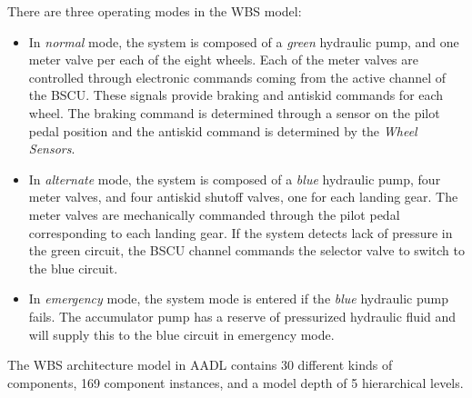 There are three operating modes in the WBS model:

\begin{itemize}
	\renewcommand{\labelitemi}{\textbullet}
	\item In \textit{normal} mode, the system is composed of a \textit{green} hydraulic pump, and one meter valve per each of the eight wheels. Each of the meter valves are controlled through electronic commands coming from the active channel of the BSCU. These signals provide braking and antiskid commands for each wheel. The braking command is determined through a sensor on the pilot pedal position and the antiskid command is determined by the \textit{Wheel Sensors}. 
	\item In \textit{alternate} mode, the system is composed of a \textit{blue} hydraulic pump, four meter valves, and four antiskid shutoff valves, one for each landing gear. The meter valves are mechanically commanded through the pilot pedal corresponding to each landing gear. If the system detects lack of pressure in the green circuit, the BSCU channel commands the selector valve to switch to the blue circuit. 
	\item In \textit{emergency} mode, the system mode is entered if the \textit{blue} hydraulic pump fails. The accumulator pump has a reserve of pressurized hydraulic fluid and will supply this to the blue circuit in emergency mode. 
\end{itemize}

The WBS architecture model in AADL contains 30 different kinds of components, 169 component instances, and a model depth of 5 hierarchical levels. 




